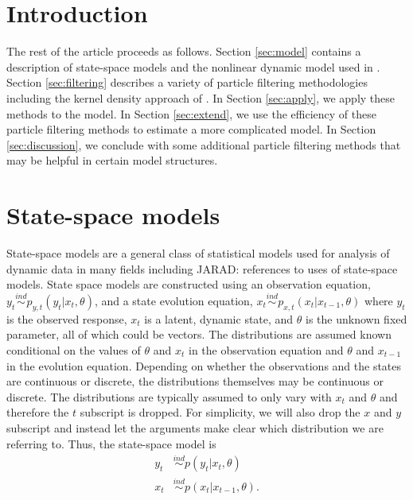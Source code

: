 \documentclass{elsarticle}
\newcommand{\jarad}[1]{{\color{red}JARAD: #1}}
\begin{document}
\section{Introduction}

The rest of the article proceeds as follows. Section \ref{sec:model} contains a description of state-space models and the nonlinear dynamic model used in \citet{skvortsov2012monitoring}. Section \ref{sec:filtering} describes a variety of particle filtering methodologies including the kernel density approach of \cite{Liu:West:comb:2001}. In Section \ref{sec:apply}, we apply these methods to the \citet{skvortsov2012monitoring} model. In Section \ref{sec:extend}, we use the efficiency of these particle filtering methods to estimate a more complicated model. In Section \ref{sec:discussion}, we conclude with some additional particle filtering methods that may be helpful in certain model structures.

\section{State-space models \label{sec:model}}

State-space models are a general class of statistical models used for analysis of dynamic data in many fields including \jarad{references to uses of state-space models}. State space models are constructed using an observation equation, $y_t \stackrel{ind}{\sim} p_{y,t}(y_t|x_t,\theta)$, and a state evolution equation, $x_t \stackrel{ind}{\sim} p_{x,t}(x_t|x_{t-1},\theta)$ where $y_t$ is the observed response, $x_t$ is a latent, dynamic state, and $\theta$ is the unknown fixed parameter, all of which could be vectors. The distributions are assumed known conditional on the values of $\theta$ and $x_t$ in the observation equation and $\theta$ and $x_{t-1}$ in the evolution equation. Depending on whether the observations and the states are continuous or discrete, the distributions themselves may be continuous or discrete. The distributions are typically assumed to only vary with $x_t$ and $\theta$ and therefore the $t$ subscript is dropped.
For simplicity, we will also drop the $x$ and $y$ subscript and instead let the arguments make clear which distribution we are referring to. Thus, the state-space model is
\begin{align*}
y_t &\stackrel{ind}{\sim} p(y_t|x_t,\theta) \\
x_t &\stackrel{ind}{\sim} p(x_t|x_{t-1},\theta).
\end{align*}
\end{document}
